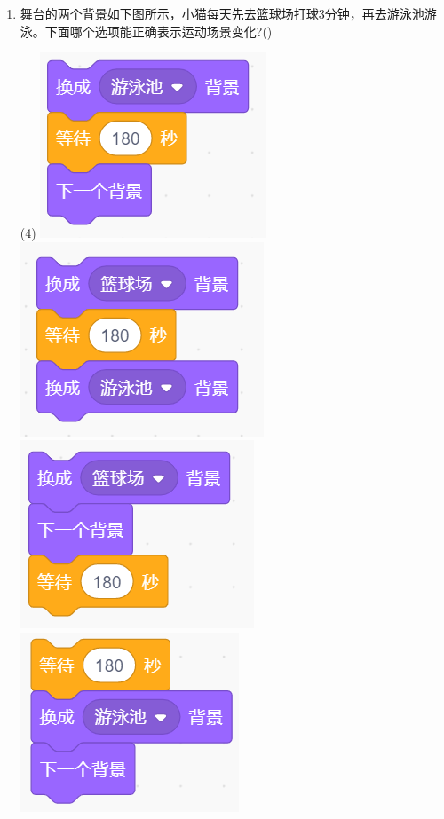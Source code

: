 \documentclass[10pt, a4paper]{article}
\begin{document}
\begin{enumerate}
        \item 舞台的两个背景如下图所示，小猫每天先去篮球场打球3分钟，再去游泳池游泳。下面哪个选项能正确表示运动场景变化?(\qquad)
        \begin{tasks}(4)
            \task \includegraphics[width=.14\textwidth]{8a.png}
            \task \includegraphics[width=.14\textwidth]{8b.png}
            \task \includegraphics[width=.14\textwidth]{8c.png}
            \task \includegraphics[width=.14\textwidth]{8d.png}
        \end{tasks}


\end{enumerate}
\end{document}
